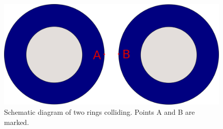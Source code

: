 \documentclass[preprint,12pt]{elsarticle}
\begin{document}
%
%
\begin{figure}[!htpb]
  \centering
  \includegraphics[width=1\linewidth]{fig_28}
  \caption{Schematic diagram of two rings colliding. Points A and B are marked.}
\label{fig:rings_initial}
\end{figure}
\end{document}
